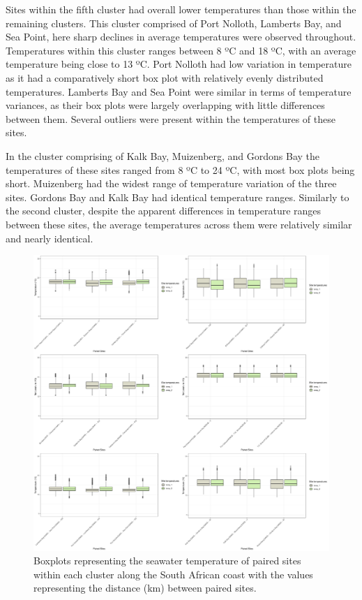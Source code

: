 \documentclass[12pt,a4paper,]{article}
\begin{document}
Sites within the fifth cluster had overall lower temperatures than those
within the remaining clusters. This cluster comprised of Port Nolloth,
Lamberts Bay, and Sea Point, here sharp declines in average temperatures
were observed throughout. Temperatures within this cluster ranges
between 8 ºC and 18 ºC, with an average temperature being close to 13
ºC. Port Nolloth had low variation in temperature as it had a
comparatively short box plot with relatively evenly distributed
temperatures. Lamberts Bay and Sea Point were similar in terms of
temperature variances, as their box plots were largely overlapping with
little differences between them. Several outliers were present within
the temperatures of these sites.

In the cluster comprising of Kalk Bay, Muizenberg, and Gordons Bay the
temperatures of these sites ranged from 8 ºC to 24 ºC, with most box
plots being short. Muizenberg had the widest range of temperature
variation of the three sites. Gordons Bay and Kalk Bay had identical
temperature ranges. Similarly to the second cluster, despite the
apparent differences in temperature ranges between these sites, the
average temperatures across them were relatively similar and nearly
identical.

\begin{figure}
\centering
\includegraphics{../figures/combined_plot.pdf}
\caption{Boxplots representing the seawater temperature of paired sites
within each cluster along the South African coast with the values
representing the distance (km) between paired sites.}
\end{figure}
\end{document}
